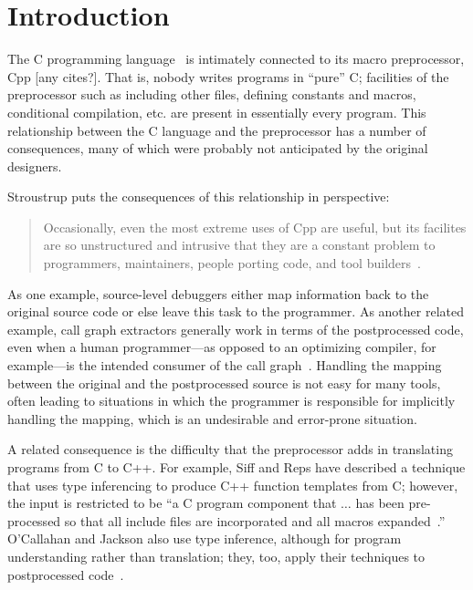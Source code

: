 \bigskip

\section{Introduction}

The C programming language~\cite{kr,ansi} is intimately connected to
its macro preprocessor, Cpp [any cites?].  That is, nobody writes
programs in ``pure'' C; facilities of the preprocessor such as
including other files, defining constants and macros, conditional
compilation, etc. are present in essentially every program.  This
relationship between the C language and the preprocessor has a number
of consequences, many of which were probably not anticipated by the
original designers.

Stroustrup puts the consequences of this relationship in perspective:
\begin{quote}
Occasionally, even the most extreme uses of Cpp are useful, but its
facilites are so unstructured and intrusive that they are a constant
problem to programmers, maintainers, people porting code, and tool
builders~\cite[p.~424]{Stroustrup-DesignEvolution}.
\end{quote}

As one example, source-level debuggers either map information back to
the original source code or else leave this task to the programmer.
As another related example, call graph extractors generally work in
terms of the postprocessed code, even when a human programmer---as
opposed to an optimizing compiler, for example---is the intended
consumer of the call graph~\cite{Murphy-icse18}.  Handling the mapping
between the original and the postprocessed source is not easy for many
tools, often leading to situations in which the programmer is
responsible for implicitly handling the mapping, which is an
undesirable and error-prone situation.

A related consequence is the difficulty that the preprocessor adds in
translating programs from C to C++.  For example, Siff and Reps have
described a technique that uses type inferencing to produce C++
function templates from C; however, the input is restricted to be ``a
C program component that $\ldots$ has been pre-processed so that all
include files are incorporated and all macros
expanded~\cite[p.~145]{Siff-fse96}.''  O'Callahan and Jackson also use
type inference, although for program understanding rather than
translation; they, too, apply their techniques to postprocessed
code~\cite{OCallahan-icse97}. 

